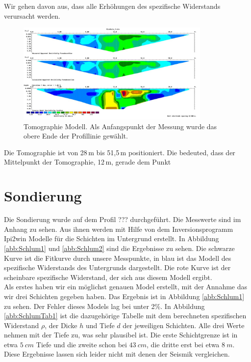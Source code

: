 Wir gehen davon aus, dass alle Erhöhungen des spezifische Widerstands verursacht werden. 


\begin{figure}[h]
\centering
\includegraphics[width=0.85\textwidth]{fig/Tomographie.pdf}
\caption{Tomographie Modell. Als Anfangspunkt der Messung wurde das obere Ende der Profillinie gewählt.}
\label{abb:Tomographie}
\end{figure}

Die Tomographie ist von 28\,m  bis 51,5\,m positioniert. Die bedeuted, dass der Mittelpunkt der Tomographie, 12\,m, gerade dem Punkt  


\section{Sondierung}
Die Sondierung wurde auf dem Profil ??? durchgeführt. Die Messwerte sind im Anhang zu sehen. Aus ihnen werden mit Hilfe von dem Inversionsprogramm Ipi2win Modelle für die Schichten im Untergrund erstellt. In Abbildung \ref{abb:Schlum1} und \ref{abb:Schlum2} sind die Ergebnisse zu sehen. Die schwarze Kurve ist die Fitkurve durch unsere Messpunkte, in blau ist das Modell des spezifische Widerstands des Untergrunds dargestellt. Die rote Kurve ist der scheinbare spezifische Widerstand, der sich aus diesem Modell ergibt.\\
Als erstes haben wir ein möglichst genauen Model erstellt, mit der Annahme das wir drei Schichten gegeben haben. Das Ergebnis ist in Abbildung \ref{abb:Schlum1} zu sehen. Der Fehler dieses Models lag bei unter 2\%. In Abbildung \ref{abb:SchlumTab1} ist die dazugehörige Tabelle mit dem berechneten spezifischen Widerstand $\rho$, der Dicke $h$ und Tiefe $d$ der jeweiligen Schichten.  Alle drei Werte nehmen mit der Tiefe zu, was sehr plausibel ist. Die erste Schichtgrenze ist in etwa $\SI{5}{cm}$ Tiefe und die zweite schon bei $\SI{43}{cm}$, die dritte erst bei etwa $\SI{8}{m}$. Diese Ergebnisse lassen sich leider nicht mit denen der Seismik vergleichen. 



